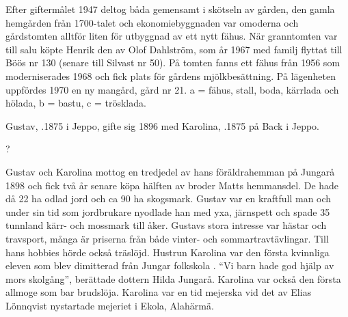Efter giftermålet 1947 deltog båda gemensamt i skötseln av gården, den gamla hemgården från 1700-talet och ekonomiebyggnaden var omoderna och gårdstomten alltför liten för utbyggnad av ett nytt fähus. När granntomten var till salu köpte Henrik den av Olof Dahlström, som år 1967 med familj flyttat till Böös nr 130 (senare till Silvast nr 50). På tomten fanns ett fähus från 1956 som moderniserades 1968 och fick plats för gårdens mjölkbesättning. På lägenheten uppfördes 1970 en ny mangård, gård nr 21. a = fähus, stall, boda, kärrlada och hölada, b = bastu, c = trösklada.


%
Gustav, .1875 i Jeppo, gifte sig 1896 med Karolina, .1875 på Back i Jeppo.
\begin{jhchildren}
  \item {}
  \item {}?
  \item {}
  \item {}
  \item {}
  \item {}
  \item {}
  \item {}
  \item {}
  \item {}
  \item {}
\end{jhchildren}
Gustav och Karolina mottog en tredjedel av hans föräldrahemman 	på Jungarå 1898 och fick två år senare köpa hälften av broder Matts 	hemmansdel. De hade då 22 ha odlad jord och ca 90 ha skogsmark. Gustav var en kraftfull man och under sin tid som jordbrukare nyodlade han med yxa, järnspett och spade 35 tunnland kärr- och mossmark till åker. Gustavs stora intresse var hästar och travsport, många är priserna från både vinter- och sommartravtävlingar. Till hans hobbies hörde också träslöjd. Hustrun Karolina var den första kvinnliga eleven som blev dimitterad från Jungar folkskola . ``Vi barn 	hade god hjälp av mors skolgång'', berättade dottern Hilda Jungarå. Karolina var också den första allmoge som bar brudslöja. Karolina var en tid mejerska vid det av Elias Lönnqvist nystartade mejeriet i Ekola, Alahärmä.

